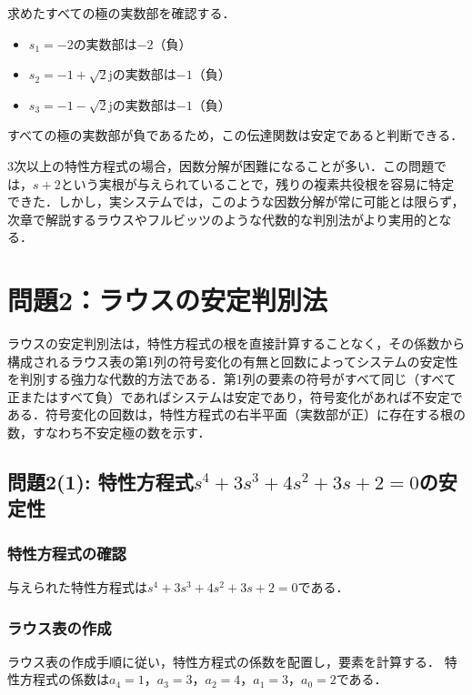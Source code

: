 \documentclass[11pt,a4paper]{ltjsarticle}
\begin{document}
求めたすべての極の実数部を確認する．

\begin{itemize}
\item $s_1=-2$の実数部は$-2$（負）
\item $s_2=-1+\sqrt{2}\mathrm{j}$の実数部は$-1$（負）
\item $s_3=-1-\sqrt{2}\mathrm{j}$の実数部は$-1$（負）
\end{itemize}

すべての極の実数部が負であるため，この伝達関数は安定であると判断できる．

3次以上の特性方程式の場合，因数分解が困難になることが多い．この問題では，$s+2$という実根が与えられていることで，残りの複素共役根を容易に特定できた．しかし，実システムでは，このような因数分解が常に可能とは限らず，次章で解説するラウスやフルビッツのような代数的な判別法がより実用的となる．

\section{問題2：ラウスの安定判別法}

ラウスの安定判別法は，特性方程式の根を直接計算することなく，その係数から構成されるラウス表の第1列の符号変化の有無と回数によってシステムの安定性を判別する強力な代数的方法である．第1列の要素の符号がすべて同じ（すべて正またはすべて負）であればシステムは安定であり，符号変化があれば不安定である．符号変化の回数は，特性方程式の右半平面（実数部が正）に存在する根の数，すなわち不安定極の数を示す．

\subsection{\texorpdfstring{問題2(1): 特性方程式$s^4+3s^3+4s^2+3s+2=0$の安定性}{問題2(1): 特性方程式の安定性}}

\subsubsection{特性方程式の確認}

与えられた特性方程式は$s^4+3s^3+4s^2+3s+2=0$である．

\subsubsection{ラウス表の作成}

ラウス表の作成手順に従い，特性方程式の係数を配置し，要素を計算する．
特性方程式の係数は$a_4=1$，$a_3=3$，$a_2=4$，$a_1=3$，$a_0=2$である．
\end{document}
